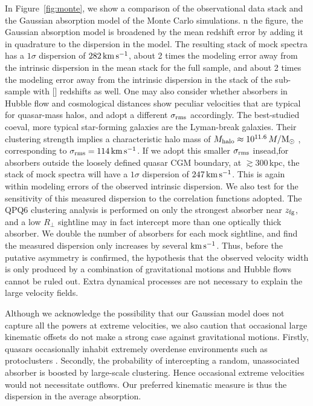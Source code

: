 \documentclass[iop]{emulateapj}
\begin{document}
In Figure~\ref{fig:monte}, we show a comparison of the observational data stack and the Gaussian
absorption model of the Monte Carlo simulations.
n the figure, the Gaussian absorption model is
broadened by the mean redshift error by adding it in quadrature to the dispersion in the model.
The resulting stack of mock spectra has a $1\sigma$ dispersion of $282\,{\rm km\,s^{-1}}$,
about 2 times the modeling error away from the intrinsic dispersion in the  mean stack
for the full sample, and about 2 times the modeling error away from the intrinsic dispersion in the
stack of the sub-sample with [] redshifts as well.
One may also consider whether absorbers in Hubble flow and cosmological distances show peculiar
velocities that are typical for quasar-mass halos, and adopt a different $\sigma_{\rm rms}$ accordingly.
The best-studied coeval, more typical star-forming
galaxies are the Lyman-break galaxies. Their clustering strength implies a characteristic halo
mass of $M_{\rm halo}\approx10^{11.6}\,M/{\rm M_\odot}$ \citep{Bielby+13,Malkan+17}, corresponding to
$\sigma_{\rm rms}=114\,{\rm km\,s^{-1}}$.
If we adopt this smaller $\sigma_{\rm rms}$ insead,for absorbers outside the loosely
defined quasar CGM boundary, at $\gtrsim300$\,kpc, the stack of mock spectra will have a $1\sigma$
dispersion of $247\,{\rm km\,s^{-1}}$. This is again within modeling errors of the observed intrinsic
dispersion.
We also test for the
sensitivity of this measured dispersion to the correlation functions adopted. The QPQ6 clustering
analysis is performed on only the strongest absorber near $z_{\rm fg}$, and a low $R_\perp$
sightline may in fact intercept more than one optically thick absorber. We double the number of
absorbers for each mock sightline, and find the measured dispersion only increases by several
${\rm km\,s^{-1}}$. Thus, before the putative asymmetry is confirmed, the hypothesis that the
observed velocity width is only produced by a
combination of gravitational motions and Hubble flows cannot be ruled out. Extra dynamical
processes are not necessary to explain the large velocity fields.

Although we acknowledge the possibility that our Gaussian model does not capture all the powers
at extreme velocities, we also caution that occasional large kinematic offsets do not make a strong
case against gravitational motions. Firstly, quasars occasionally inhabit extremely overdense environments
such as protoclusters \citep[e.g.,][]{Hennawi+15}. Secondly, the probability of intercepting a random,
unassociated absorber is boosted by large-scale clustering. Hence occasional extreme velocities would not
necessitate outflows. Our preferred kinematic measure is thus the dispersion in the average absorption.
\end{document}
